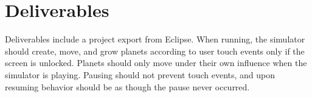 \section{Deliverables}

Deliverables include a project export from Eclipse.
When running, the simulator should create, move, and grow planets according to user touch events only if the screen is unlocked.
Planets should only move under their own influence when the simulator is playing.
Pausing should not prevent touch events, and upon resuming behavior should be as though the pause never occurred.